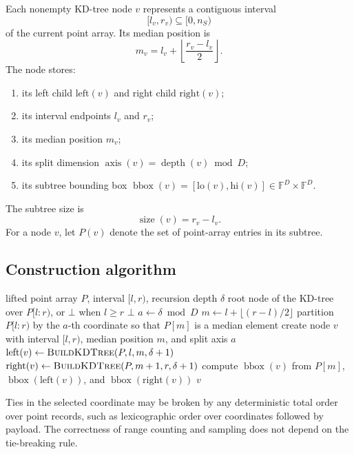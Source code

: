 \documentclass[11pt]{article}
\theoremstyle{definition}
\theoremstyle{plain}
\theoremstyle{remark}
\DeclareMathOperator{\axis}{axis}
\DeclareMathOperator{\bbox}{bbox}
\DeclareMathOperator{\size}{size}
\newcommand{\F}{\mathbb F}
\newcommand{\lo}{\mathrm{lo}}
\newcommand{\hi}{\mathrm{hi}}
\newcommand{\nil}{\bot}
\newcommand{\lch}{\mathrm{left}}
\newcommand{\rch}{\mathrm{right}}
\begin{document}
Each nonempty KD-tree node $v$ represents a contiguous interval
\[
  [l_v,r_v)\subseteq [0,n_S)
\]
of the current point array.  Its median position is
\[
  m_v = l_v + \left\lfloor\frac{r_v-l_v}{2}\right\rfloor.
\]
The node stores:
\begin{enumerate}[leftmargin=2em]
  \item its left child $\lch(v)$ and right child $\rch(v)$;
  \item its interval endpoints $l_v$ and $r_v$;
  \item its median position $m_v$;
  \item its split dimension $\axis(v)=\operatorname{depth}(v)\bmod D$;
  \item its subtree bounding box
        $\bbox(v)=[\lo(v),\hi(v)]\in\F^D\times\F^D$.
\end{enumerate}
The subtree size is
\[
  \size(v)=r_v-l_v.
\]
For a node $v$, let $P(v)$ denote the set of point-array entries in its subtree.

\subsection{Construction algorithm}

\begin{algorithm}[htbp]
\caption{\textsc{BuildKDTree}$(P,l,r,\delta)$}
\begin{algorithmic}[1]
\Require lifted point array $P$, interval $[l,r)$, recursion depth $\delta$
\Ensure root node of the KD-tree over $P[l:r)$, or $\nil$ when $l\ge r$
  \State \Return $\nil$
\EndIf
\State $a\gets \delta\bmod D$
\State $m\gets l+\lfloor(r-l)/2\rfloor$
\State partition $P[l:r)$ by the $a$-th coordinate so that $P[m]$ is a median element
\State create node $v$ with interval $[l,r)$, median position $m$, and split axis $a$
\State $\lch(v)\gets\textsc{BuildKDTree}(P,l,m,\delta+1)$
\State $\rch(v)\gets\textsc{BuildKDTree}(P,m+1,r,\delta+1)$
\State compute $\bbox(v)$ from $P[m]$, $\bbox(\lch(v))$, and $\bbox(\rch(v))$
\State \Return $v$
\end{algorithmic}
\end{algorithm}

Ties in the selected coordinate may be broken by any deterministic total order over point
records, such as lexicographic order over coordinates followed by payload.  The correctness
of range counting and sampling does not depend on the tie-breaking rule.
\end{document}
